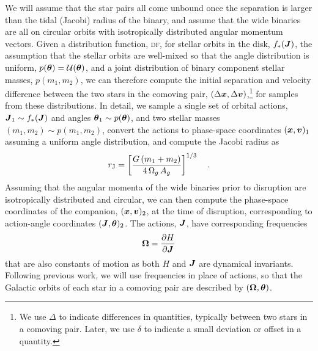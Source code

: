 \documentclass[modern, letterpaper]{aastex61}
\newcommand{\DF}{\textsc{df}}
\begin{document}
We will assume that the star pairs all come unbound once the separation is
larger than the tidal (Jacobi) radius of the binary, and assume that the wide
binaries are all on circular orbits with isotropically distributed angular
momentum vectors.
Given a distribution function, \DF, for stellar orbits in the disk,
$f_*(\boldsymbol{J})$, the assumption that the stellar orbits are well-mixed so that the
angle distribution is uniform, $p(\boldsymbol{\theta}) = \mathcal{U}(\boldsymbol{\theta})$, and
a joint distribution of binary component stellar masses, $p(m_1, m_2)$, we can
therefore compute the initial separation and velocity difference between the two
stars in the comoving pair, $(\Delta \boldsymbol{x}, \Delta \boldsymbol{v})$,\footnote{We use
$\Delta$ to indicate differences in quantities, typically between two stars in a
comoving pair. Later, we use $\delta$ to indicate a small deviation or offset in
a quantity.} for samples from these distributions.
In detail, we sample a single set of orbital actions, $\boldsymbol{J}_1 \sim
f_*(\boldsymbol{J})$ and angles $\boldsymbol{\theta}_1 \sim p(\boldsymbol{\theta})$, and two stellar
masses $(m_1, m_2) \sim p(m_1, m_2)$, convert the actions to phase-space
coordinates $(\boldsymbol{x}, \boldsymbol{v})_1$ assuming a uniform angle distribution, and
compute the Jacobi radius as
\begin{equation}
    r_{\rm J} = \left[\frac{G\,(m_1 + m_2)}{4\,\Omega_g \, A_g} \right]^{1/3}\quad .
\end{equation}
Assuming that the angular momenta of the wide binaries prior to disruption are
isotropically distributed and circular, we can then compute the phase-space
coordinates of the companion, $(\boldsymbol{x}, \boldsymbol{v})_2$, at the time of disruption,
corresponding to action-angle coordinates $(\boldsymbol{J}, \boldsymbol{\theta})_2$.
The actions, $\boldsymbol{J}$, have corresponding frequencies
\begin{equation}
    \bs{\Omega} = \frac{\partial H}{\partial \bs{J}}
\end{equation}
that are also constants of motion as both $H$ and $\boldsymbol{J}$ are dynamical
invariants.
Following previous work, we will use frequencies in place of actions, so that
the Galactic orbits of each star in a comoving pair are described by
$(\boldsymbol{\Omega}, \boldsymbol{\theta})$.
\end{document}
